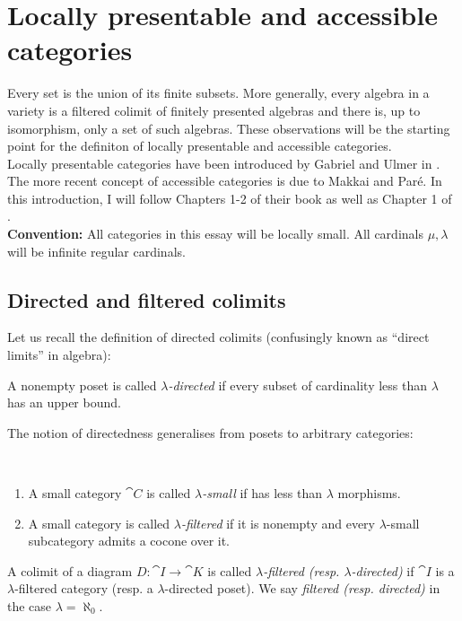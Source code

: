 \section{Locally presentable and accessible categories}
\label{sec:presentableaccessible}

Every set is the union of its finite subsets. More generally, every algebra in a variety is a filtered colimit of finitely presented algebras and there is, up to isomorphism, only a set of such algebras. These observations will be the starting point for the definiton of locally presentable and accessible categories. \\

Locally presentable categories have been introduced by Gabriel and Ulmer in \cite{GabrielUlmer}. The more recent concept of accessible categories is due to Makkai and Paré. In this introduction, I will follow Chapters 1-2 of their book \cite{MakkaiPare} as well as Chapter 1 of \cite{AdamekRosicky}.\\

\textbf{Convention: } All categories in this essay will be locally small. All cardinals $\mu,\lambda$ will be infinite regular cardinals.

\subsection{Directed and filtered colimits}

Let us recall the definition of directed colimits (confusingly known as ``direct limits'' in algebra):
\begin{Definition}
A nonempty poset is called \emph{$\lambda$-directed} if every subset of cardinality less than $\lambda$ has an upper bound.
\end{Definition}

The notion of directedness generalises from posets to arbitrary categories:

\begin{Definition}\
\begin{enumerate}
\item A small category $\cat C$ is called \emph{$\lambda$-small} if has less than $\lambda$ morphisms. 
\item A small category is called \emph{$\lambda$-filtered} if it is nonempty and every $\lambda$-small subcategory admits a cocone over it. 
\end{enumerate}
A colimit of a diagram $D : \cat I \to \cat K$ is called \emph{$\lambda$-filtered (resp. $\lambda$-directed)} if $\cat I$ is a $\lambda$-filtered category (resp. a $\lambda$-directed poset). We say \emph{filtered (resp. directed)} in the case $\lambda = \aleph_0$.
\end{Definition}

